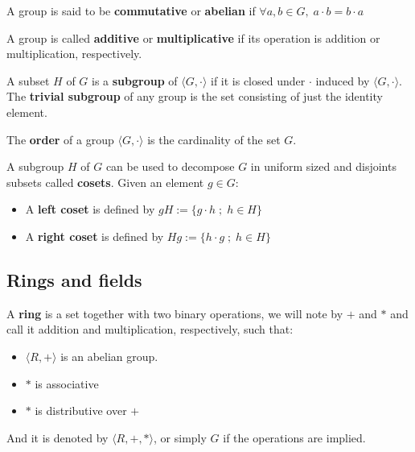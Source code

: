 \documentclass[a4paper,12pt]{article}
\begin{document}
\begin{definition}
  A group is said to be \textbf{commutative} or \textbf{abelian}
  if $\forall a, b \in G, \; a\cdot b = b\cdot a$
\end{definition}

\noindent
A group is called \textbf{additive} or \textbf{multiplicative} if its
operation is addition or multiplication, respectively.

\begin{definition}
  A subset $H$ of $G$ is a \textbf{subgroup} of $\langle G,\cdot \rangle$ if it is
  closed under $\cdot$ induced by $\langle G,\cdot \rangle$. The \textbf{trivial subgroup} of any
  group is the set consisting of just the identity element.
\end{definition}

\begin{definition}
  The \textbf{order} of a group $\langle G,\cdot\rangle$ is the cardinality of the set $G$.
\end{definition}

\begin{definition}
  A subgroup $H$ of $G$ can be used to decompose $G$ in uniform sized and
  disjoints subsets called \textbf{cosets}. Given an element $g \in G$:
  \begin{itemize}
  \item A \textbf{left coset} is defined by $gH := \{g\cdot h \; ; \; h \in H\}$
  \item A \textbf{right coset} is defined by $Hg := \{h\cdot g \; ; \; h \in H\}$
  \end{itemize}
\end{definition}

\subsection{Rings and fields}
\label{sec:orgd3a12e0}

   \begin{definition}
  A \textbf{ring} is a set together with two binary operations, we will note by
  $+$ and $*$ and call it addition and multiplication, respectively, such that:
  \begin{itemize}
  \item $\langle R,+\rangle$ is an abelian group.
  \item $*$ is associative
  \item $*$ is distributive over $+$
  \end{itemize}

  And it is denoted by $\langle R,+,*\rangle$, or simply $G$ if the operations are implied.
\end{definition}
\end{document}
